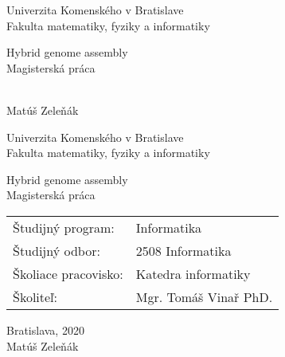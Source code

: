 \documentclass[12pt, oneside]{book}
\theoremstyle{definition}
\def\mfrok{2020}
\def\mfnazov{Hybrid genome assembly}
\def\mftyp{Magisterská práca}
\def\mfautor{Matúš Zeleňák}
\def\mfskolitel{Mgr. Tomáš Vinař PhD.}
\def\mfmiesto{Bratislava, \mfrok}
\def\mfodbor{2508 Informatika}
\def\program{ Informatika }
\def\mfpracovisko{ Katedra informatiky }
\begin{document}
     
\frontmatter


\thispagestyle{empty}

\begin{center}
\sc\large
Univerzita Komenského v Bratislave\\
Fakulta matematiky, fyziky a informatiky

\vfill

{\LARGE\mfnazov}\\
\mftyp
\end{center}

\vfill

{\sc\large 
\noindent \mfrok\\
\mfautor
}

\eject %

\thispagestyle{empty}
\noindent

\begin{center}
\sc  
\large
Univerzita Komenského v Bratislave\\
Fakulta matematiky, fyziky a informatiky

\vfill

{\LARGE\mfnazov}\\
\mftyp
\end{center}

\vfill

\noindent
\begin{tabular}{ll}
Študijný program: & \program \\
Študijný odbor: & \mfodbor \\
Školiace pracovisko: & \mfpracovisko \\
Školiteľ: & \mfskolitel \\
\end{tabular}

\vfill


\noindent \mfmiesto\\
\mfautor

\eject %








\end{document}

